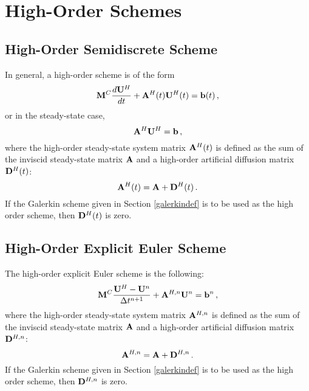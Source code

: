 \section{High-Order Schemes}
\subsection{High-Order Semidiscrete Scheme}
In general, a high-order scheme is of the form
\begin{equation}\label{high_semidiscrete}
   \mathbf{M}^C\frac{d\mathbf{U}^{H}}{dt} + \mathbf{A}^H(t)\mathbf{U}^H(t) = \mathbf{b}(t) \,,
\end{equation}
or in the steady-state case,
\begin{equation}\label{high_ss}
   \mathbf{A}^H\mathbf{U}^H = \mathbf{b} \,,
\end{equation}
where the high-order steady-state system matrix $\mathbf{A}^H(t)$ is
defined as the sum of the inviscid steady-state matrix $\mathbf{A}$
and a high-order artificial diffusion matrix $\mathbf{D}^H(t)$:
\begin{equation}
   \mathbf{A}^H(t) = \mathbf{A} + \mathbf{D}^H(t) \,.
\end{equation}
If the Galerkin scheme given in Section \ref{galerkindef} is to be
used as the high order scheme, then $\mathbf{D}^H(t)$ is zero.
\subsection{High-Order Explicit Euler Scheme}
The high-order explicit Euler scheme is the following:
\begin{equation}\label{high_FE}
   \mathbf{M}^C\frac{\mathbf{U}^{H}-\mathbf{U}^n}{\Delta t^{n+1}} + \mathbf{A}^{H,n}\mathbf{U}^n = \mathbf{b}^n \,,
\end{equation}
where the high-order steady-state system matrix $\mathbf{A}^{H,n}$ is
defined as the sum of the inviscid steady-state matrix $\mathbf{A}$
and a high-order artificial diffusion matrix $\mathbf{D}^{H,n}$:
\begin{equation}
   \mathbf{A}^{H,n} = \mathbf{A} + \mathbf{D}^{H,n} \,.
\end{equation}
If the Galerkin scheme given in Section \ref{galerkindef} is to be
used as the high order scheme, then $\mathbf{D}^{H,n}$ is zero.
